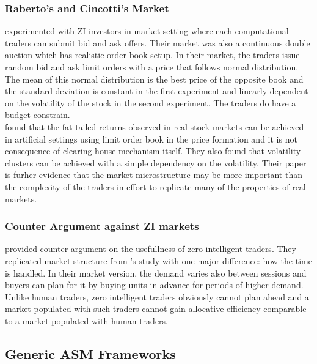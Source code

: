 \subsubsection{Raberto's and Cincotti's Market}
\citet{Raberto05} experimented with ZI investors in market setting
where each computational traders can submit bid and ask offers. Their
market was also a continuous double auction which has realistic order
book setup. In their market, the traders issue random bid and ask limit
orders with a price that follows normal distribution. The mean of this 
normal distribution is the best price of the opposite book and the 
standard deviation is constant in the first experiment and linearly 
dependent on the volatility of the stock in the second experiment. The
traders do have a budget constrain. \\

\citeauthor{Raberto05} found that the fat tailed returns observed in
real stock markets can be achieved in artificial settings using limit 
order book in the price formation and it is not consequence of clearing 
house mechanism itself. They also found that volatility clusters can
be achieved with a simple dependency on the volatility. Their paper
is furher evidence that the market microstructure may be more
important than the complexity of the traders in effort to replicate
many of the properties of real markets.

\subsubsection{Counter Argument against ZI markets}
\citet{Mil08} provided counter argument on the usefullness of zero
intelligent traders. They replicated market structure from
\citeauthor{God93}'s study with one major difference: how the 
time is handled. In their market version, the demand varies
also between sessions and buyers can plan for it by buying units
in advance for periods of higher demand. Unlike human traders,
zero intelligent traders obviously cannot plan ahead and a market
populated with such traders cannot gain allocative efficiency comparable
to a market populated with human traders. 


\subsection{Generic ASM Frameworks}

